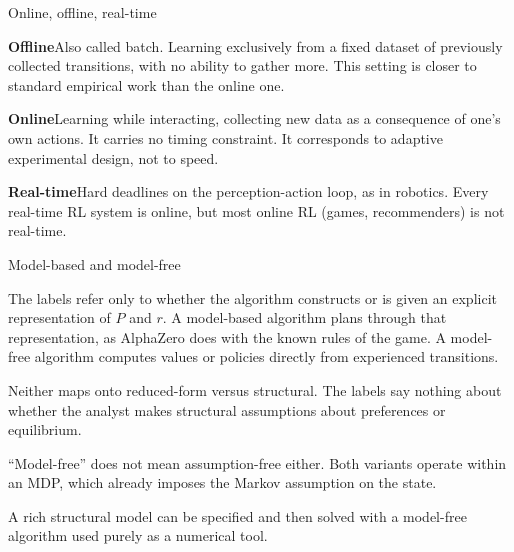 \begin{frame}{Online, offline, real-time}

\textbf{\textcolor{rlblue}{Offline}}\quad Also called batch. Learning exclusively
from a fixed dataset of previously collected transitions, with no ability to gather
more. This setting is closer to standard empirical work than the online one.

\bigskip
\textbf{\textcolor{rlblue}{Online}}\quad Learning while interacting, collecting new
data as a consequence of one's own actions. It carries \alert{no timing
constraint}. It corresponds to adaptive experimental design, not to speed.

\bigskip
\textbf{\textcolor{rlblue}{Real-time}}\quad Hard deadlines on the perception-action
loop, as in robotics. Every real-time RL system is online, but most online RL
(games, recommenders) is not real-time.
\end{frame}

\begin{frame}{Model-based and model-free}

The labels refer only to whether the algorithm constructs or is given an explicit
representation of $P$ and $r$. A model-based algorithm plans through that
representation, as AlphaZero does with the known rules of the game. A model-free
algorithm computes values or policies directly from experienced transitions.

\bigskip
\alert{Neither maps onto reduced-form versus structural.} The labels say nothing
about whether the analyst makes structural assumptions about preferences or
equilibrium.

\bigskip
``Model-free'' does not mean assumption-free either. Both variants operate within
an MDP, which already imposes the Markov assumption on the state.

\bigskip
A rich structural model can be specified and then solved with a model-free
algorithm used purely as a numerical tool.
\end{frame}

